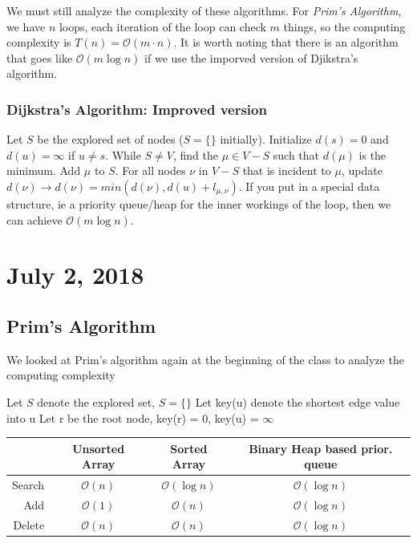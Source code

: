 \documentclass[11pt,letterpaper]{article}
\begin{document}
We must still analyze the complexity of these algorithms. For \textit{Prim's Algorithm}, we have $n$ loops, each iteration of the loop can check $m$ things, so the computing complexity is $T(n) = \mathcal{O}(m\cdot n)$. It is worth noting that there is an algorithm that goes like $\mathcal{O}(m \log n)$ if we use the imporved version of Djikstra's algorithm. 

\subsubsection*{Dijkstra's Algorithm: Improved version}
Let $S$ be the explored set of nodes ($S = \{\}$ initially). Initialize $d(s) = 0$ and $d(u) = \infty$ if $u \neq s$. While $S \neq V$, find the $\mu \in V-S$ such that $d(\mu)$ is the minimum. Add $\mu$ to $S$. For all nodes $\nu$ in $V-S$ that is incident to $\mu$, update $d(\nu) \to d(\nu) = min(d(\nu), d(u) + l_{\mu, \nu})$. If you put in a special data structure, ie a priority queue/heap for the inner workings of the loop, then we can achieve $\mathcal{O}(m \log n)$.

\section{July 2, 2018}


\subsection*{Prim's Algorithm}
We looked at Prim's algorithm again at the beginning of the class to analyze the computing complexity

\begin{algorithm}[H]
	Let $S$ denote the explored set, $S = \{ \}$\;
	Let key(u) denote the shortest edge value into u\;
	Let r be the root node, key(r) = 0, key(u) = $\infty$\;
\end{algorithm}

\renewcommand{\arraystretch}{1.5}
\begin{tabular}{ r |c | c | c} \hline
& Unsorted Array & Sorted Array & Binary Heap based prior. queue \\ \hline \hline
Search & $\mathcal{O}(n)$ & $\mathcal{O}(\log n)$ & $\mathcal{O}(\log n)$ \\ \hline
Add & $\mathcal{O}(1)$ & $\mathcal{O}(n)$ & $\mathcal{O}(\log n)$ \\ \hline
Delete & $\mathcal{O}(n)$ & $\mathcal{O}(n)$ & $\mathcal{O}(\log n)$ \\ \hline
\end{tabular}
\end{document}

